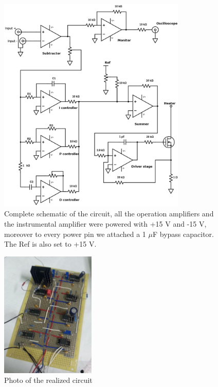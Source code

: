 \documentclass[a4paper,10pt]{article}
\begin{document}
\begin{figure}[H]
\centering
\includegraphics[width=0.8\textwidth]{circuit}
\caption{Complete schematic of the circuit, all the operation amplifiers and the instrumental amplifier were powered with +15 V and -15 V, moreover to every power pin we attached a 1 $\mu$F bypass capacitor. The Ref is also set to +15 V.}\label{circuit}
\end{figure}
\begin{figure}[H]
\centering
\includegraphics[width=0.4\textwidth]{photocircuit}
\caption{Photo of the realized circuit}\label{photocircuit}
\end{figure}
\end{document}
